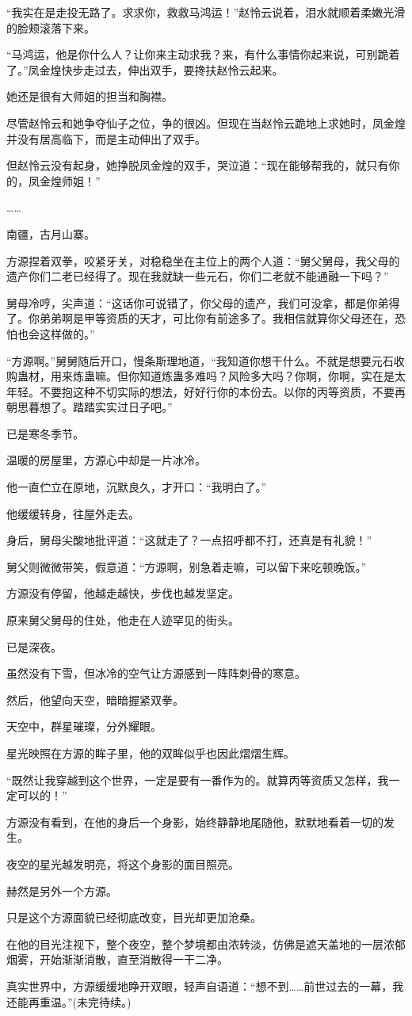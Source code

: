 \begin{this_body}
“我实在是走投无路了。求求你，救救马鸿运！”赵怜云说着，泪水就顺着柔嫩光滑的脸颊滚落下来。

“马鸿运，他是你什么人？让你来主动求我？来，有什么事情你起来说，可别跪着了。”凤金煌快步走过去，伸出双手，要搀扶赵怜云起来。

她还是很有大师姐的担当和胸襟。

尽管赵怜云和她争夺仙子之位，争的很凶。但现在当赵怜云跪地上求她时，凤金煌并没有居高临下，而是主动伸出了双手。

但赵怜云没有起身，她挣脱凤金煌的双手，哭泣道：“现在能够帮我的，就只有你的，凤金煌师姐！”

……

南疆，古月山寨。

方源捏着双拳，咬紧牙关，对稳稳坐在主位上的两个人道：“舅父舅母，我父母的遗产你们二老已经得了。现在我就缺一些元石，你们二老就不能通融一下吗？”

舅母冷哼，尖声道：“这话你可说错了，你父母的遗产，我们可没拿，都是你弟得了。你弟弟啊是甲等资质的天才，可比你有前途多了。我相信就算你父母还在，恐怕也会这样做的。”

“方源啊。”舅舅随后开口，慢条斯理地道，“我知道你想干什么。不就是想要元石收购蛊材，用来炼蛊嘛。但你知道炼蛊多难吗？风险多大吗？你啊，你啊，实在是太年轻。不要抱这种不切实际的想法，好好行你的本份去。以你的丙等资质，不要再朝思暮想了。踏踏实实过日子吧。”

已是寒冬季节。

温暖的房屋里，方源心中却是一片冰冷。

他一直伫立在原地，沉默良久，才开口：“我明白了。”

他缓缓转身，往屋外走去。

身后，舅母尖酸地批评道：“这就走了？一点招呼都不打，还真是有礼貌！”

舅父则微微带笑，假意道：“方源啊，别急着走嘛，可以留下来吃顿晚饭。”

方源没有停留，他越走越快，步伐也越发坚定。

原来舅父舅母的住处，他走在人迹罕见的街头。

已是深夜。

虽然没有下雪，但冰冷的空气让方源感到一阵阵刺骨的寒意。

然后，他望向天空，暗暗握紧双拳。

天空中，群星璀璨，分外耀眼。

星光映照在方源的眸子里，他的双眸似乎也因此熠熠生辉。

“既然让我穿越到这个世界，一定是要有一番作为的。就算丙等资质又怎样，我一定可以的！”

方源没有看到，在他的身后一个身影，始终静静地尾随他，默默地看着一切的发生。

夜空的星光越发明亮，将这个身影的面目照亮。

赫然是另外一个方源。

只是这个方源面貌已经彻底改变，目光却更加沧桑。

在他的目光注视下，整个夜空，整个梦境都由浓转淡，仿佛是遮天盖地的一层浓郁烟雾，开始渐渐消散，直至消散得一干二净。

真实世界中，方源缓缓地睁开双眼，轻声自语道：“想不到……前世过去的一幕，我还能再重温。”(未完待续。)

\end{this_body}

